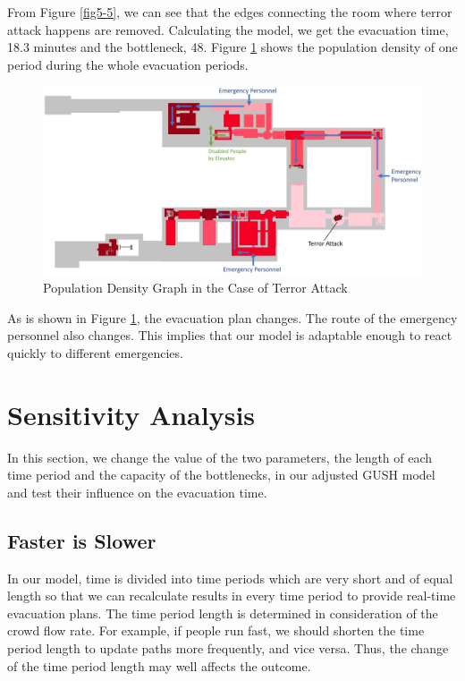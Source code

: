 \documentclass[a4paper,12pt]{article}
\begin{document}
From Figure \ref{fig5-5}, we can see that the edges connecting the room where terror attack happens are removed. Calculating the model, we get the evacuation time, 18.3 minutes and the bottleneck, 48. Figure \ref{fig5-6} shows the population density of one period during the whole evacuation periods.
\begin{figure} [H]
\centering
\includegraphics[width=15cm]{app3.jpg}
\caption{Population Density Graph in the Case of Terror Attack}
\label{fig5-6}
\end{figure}
As is shown in Figure \ref{fig5-6}, the evacuation plan changes. The route of the emergency personnel also changes. This implies that our model is adaptable enough to react quickly to different emergencies.

\section{Sensitivity Analysis}
In this section, we change the value of the two parameters, the length of each time period and the capacity of the bottlenecks, in our adjusted GUSH model and test their influence on the evacuation time. 
\subsection{Faster is Slower}
In our model, time is divided into time periods which are very short and of equal length so that we can recalculate results in every time period to provide real-time evacuation plans. The time period length is determined in consideration of the crowd flow rate. For example, if people run fast, we should shorten the time period length to update paths more frequently, and vice versa. Thus, the change of the time period length may well affects the outcome. 
\end{document}
